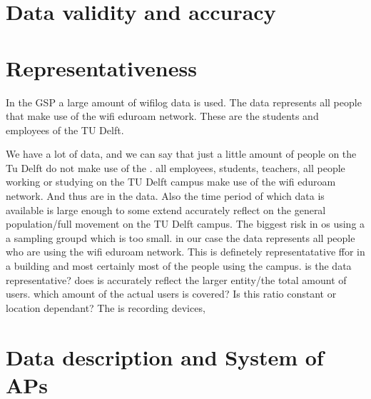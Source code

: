 \section{Data validity and accuracy}

\section{Representativeness}
In the GSP a large amount of wifilog data is used. The data represents all people that make use of the wifi eduroam network. These are the students and employees of the TU Delft.  

We have a lot of data, and we can say that just a little amount of people on the Tu Delft do not make use of the . all employees, students, teachers, all people working or studying on the TU Delft campus make use of the wifi eduroam network. And thus are in the data. Also the time period of which data is available is large enough to some extend accurately reflect on the general population/full movement on the TU Delft campus. 
The biggest risk in os using a a sampling groupd which is too small. in our case the data represents all people who are using the wifi eduroam network. This is definetely representatative ffor in a building and most certainly  most of the people using the campus. 
is the data representative? does is accurately reflect the larger entity/the total amount of users. 
which amount of the actual users is covered? Is this ratio constant or
location dependant?
The is recording devices, 

\section{Data description and System of APs}\label{datadescriptionandsystemofaps}
